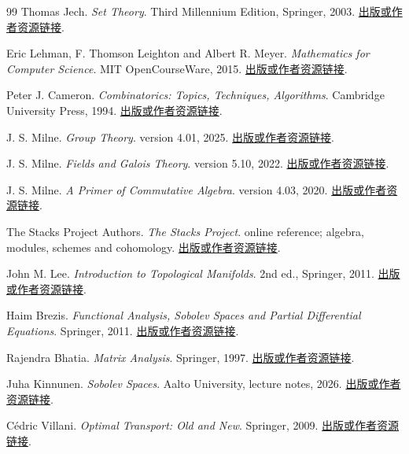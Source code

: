 \begin{thebibliography}{99}
 Thomas Jech. \emph{Set Theory}. Third Millennium Edition, Springer, 2003. \href{https://doi.org/10.1007/3-540-44761-X}{出版或作者资源链接}.

 Eric Lehman, F. Thomson Leighton and Albert R. Meyer. \emph{Mathematics for Computer Science}. MIT OpenCourseWare, 2015. \href{https://www.ocw.mit.edu/courses/6-042j-mathematics-for-computer-science-spring-2015/resources/mit6_042js15_textbook_pdf/}{出版或作者资源链接}.

 Peter J. Cameron. \emph{Combinatorics: Topics, Techniques, Algorithms}. Cambridge University Press, 1994. \href{https://webspace.maths.qmul.ac.uk/p.j.cameron/comb/}{出版或作者资源链接}.

 J. S. Milne. \emph{Group Theory}. version 4.01, 2025. \href{https://www.jmilne.org/math/CourseNotes/GT.pdf}{出版或作者资源链接}.

 J. S. Milne. \emph{Fields and Galois Theory}. version 5.10, 2022. \href{https://www.jmilne.org/math/CourseNotes/FT.pdf}{出版或作者资源链接}.

 J. S. Milne. \emph{A Primer of Commutative Algebra}. version 4.03, 2020. \href{https://www.jmilne.org/math/xnotes/ca.html}{出版或作者资源链接}.

 The Stacks Project Authors. \emph{The Stacks Project}. online reference; algebra, modules, schemes and cohomology. \href{https://stacks.math.columbia.edu/}{出版或作者资源链接}.

 John M. Lee. \emph{Introduction to Topological Manifolds}. 2nd ed., Springer, 2011. \href{https://sites.math.washington.edu/~lee/Books/ITM/}{出版或作者资源链接}.

 Haim Brezis. \emph{Functional Analysis, Sobolev Spaces and Partial Differential Equations}. Springer, 2011. \href{https://doi.org/10.1007/978-0-387-70914-7}{出版或作者资源链接}.

 Rajendra Bhatia. \emph{Matrix Analysis}. Springer, 1997. \href{https://doi.org/10.1007/978-1-4612-0653-8}{出版或作者资源链接}.

 Juha Kinnunen. \emph{Sobolev Spaces}. Aalto University, lecture notes, 2026. \href{https://math.aalto.fi/~jkkinnun/files/sobolev_spaces.pdf}{出版或作者资源链接}.

 Cédric Villani. \emph{Optimal Transport: Old and New}. Springer, 2009. \href{https://doi.org/10.1007/978-3-540-71050-9}{出版或作者资源链接}.


\end{thebibliography}
